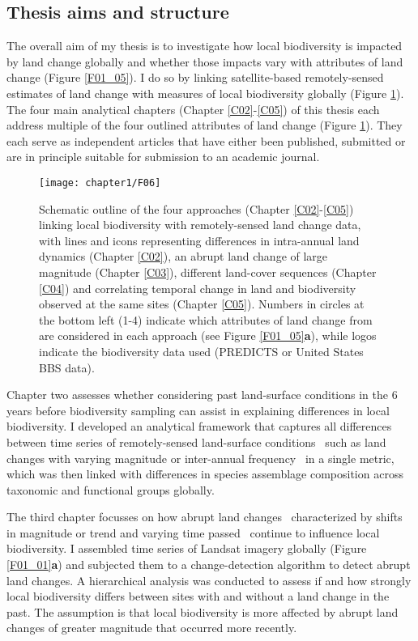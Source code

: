 \subsection{Thesis aims and structure}
\label{C01_0104}

The overall aim of my thesis is to investigate how local biodiversity is impacted by land change globally and whether those impacts vary with attributes of land change  (Figure \ref{F01_05}). I do so by linking satellite-based remotely-sensed estimates of land change with measures of local biodiversity globally   (Figure \ref{F01_06}). The four main analytical chapters (Chapter \ref{C02}-\ref{C05}) of this thesis each address multiple of the four outlined attributes of land change (Figure \ref{F01_06}). They each serve as independent articles that have either been published, submitted or are in principle suitable for submission to an academic journal.

\begin{figure}[htb]
\centering
\texttt{[image: chapter1/F06]}
\caption{ Schematic outline of the four approaches (Chapter \ref{C02}-\ref{C05}) linking local biodiversity with remotely-sensed land change data, with lines and icons representing differences in intra-annual land dynamics (Chapter \ref{C02}), an abrupt land change of large magnitude (Chapter \ref{C03}), different land-cover sequences (Chapter \ref{C04}) and correlating temporal change in land and biodiversity observed at the same sites (Chapter \ref{C05}). Numbers in circles at the bottom left (1-4) indicate which attributes of land change from \cite{Watson2014} are considered in each approach (see Figure \ref{F01_05}\textbf{a}), while logos indicate the biodiversity data used (PREDICTS or United States BBS data). }
\label{F01_06}
\end{figure}

Chapter two assesses whether considering past land-surface conditions in the 6 years before biodiversity sampling can assist in explaining differences in local biodiversity. I developed an analytical framework that captures all differences between time series of remotely-sensed land-surface conditions \textendash\ such as land changes with varying magnitude or inter-annual frequency \textendash\ in a single metric, which was then linked with differences in species assemblage composition across taxonomic and functional groups globally. 

The third chapter focusses on how abrupt land changes \textendash\ characterized by shifts in magnitude or trend and varying time passed \textendash\ continue to influence local biodiversity. I assembled time series of Landsat imagery globally (Figure \ref{F01_01}\textbf{a}) and subjected them to a change-detection algorithm to detect abrupt land changes. A hierarchical analysis was conducted to assess if and how strongly local biodiversity differs between sites with and without a land change in the past. The assumption is that local biodiversity is more affected by abrupt land changes of greater magnitude that occurred more recently.

